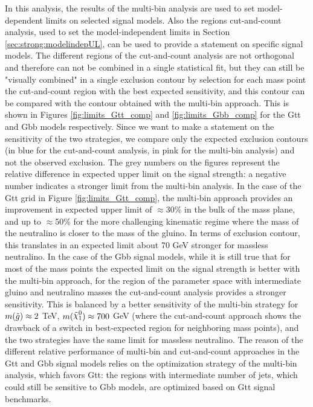 In this analysis, the results of the multi-bin analysis are used to set model-dependent limits on selected signal models.
Also the regions cut-and-count analysis, used to set the model-independent limits in Section \ref{sec:strong:modelindepUL}, 
can be used to provide a statement on specific signal models. The different regions of the cut-and-count analysis are not orthogonal 
and therefore can not be combined in a single statistical fit, but they can still be "visually combined" in a single exclusion contour 
by selection for each mass point the cut-and-count region with the best expected sensitivity, and this contour can be compared 
with the contour obtained with the multi-bin approach.
This is shown in Figures \ref{fig:limits_Gtt_comp} and \ref{fig:limits_Gbb_comp} for the Gtt and Gbb models respectively.
Since we want to make a statement on the sensitivity of the two strategies, we compare only the expected exclusion contours 
(in blue for the cut-and-count analysis, in pink for the multi-bin analysis) and not the observed exclusion. 
The grey numbers on the figures represent the relative difference in expected upper limit on the signal strength: 
a negative number indicates a stronger limit from the multi-bin analysis. 
In the case of the Gtt grid in Figure \ref{fig:limits_Gtt_comp}, the multi-bin approach provides an improvement in 
expected upper limit of $\approx$30\% in the bulk of the mass plane, and up to $\approx$50\% for the more challenging 
kinematic regime where the mass of the neutralino is closer to the mass of the gluino.
In terms of exclusion contour, this translates in an expected limit about 70 GeV stronger for massless neutralino.
In the case of the Gbb signal models, while it is still true that for most of the mass points the expected limit on the 
signal strength is better with the multi-bin approach, for the region of the parameter space with intermediate gluino and 
neutralino masses the cut-and-count analysis provides a stronger sensitivity.
This is balanced by a better sensitivity of the multi-bin strategy for $m(\tilde{g}) \approx 2$ TeV, $m(\ninoone) \approx 700$
GeV (where the cut-and-count approach shows the drawback of a switch in best-expected region for neighboring mass points),
and the two strategies have the same limit for massless neutralino. 
The reason of the different relative performance of multi-bin and cut-and-count approaches in the Gtt and Gbb signal 
models relies on the optimization strategy of the multi-bin analysis, which favors Gtt: the regions with intermediate 
number of jets, which could still be sensitive to Gbb models, are optimized based on Gtt signal benchmarks.



